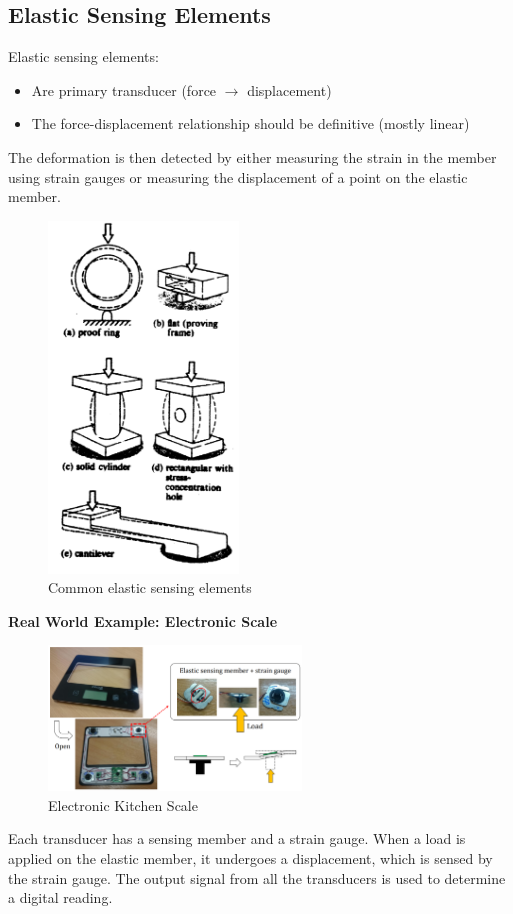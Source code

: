 \documentclass[class=report, crop=false, 12pt,a4paper]{standalone}
\begin{document}
\subsection{Elastic Sensing Elements}
Elastic sensing elements:
\begin{itemize}
  \item Are primary transducer (force $\rightarrow$ displacement)
  \item The force-displacement relationship should be definitive (mostly linear) 
\end{itemize}
The deformation is then detected by either measuring the strain in the member using strain gauges or measuring the displacement of a point on the elastic member.
\begin{figure}[H]
  \centering
  \includegraphics[width = 0.45\textwidth]{../img/Mdiagram23.png}
  \caption{Common elastic sensing elements}
\end{figure}
\textbf{Real World Example: Electronic Scale}
\begin{figure}[H]
  \centering
  \includegraphics[width = 0.6\textwidth]{../img/Mdiagram24.png}
  \caption{Electronic Kitchen Scale}
\end{figure} 
Each transducer has a sensing member and a strain gauge. When a load is applied on the elastic member, it undergoes a displacement, which is sensed by the strain gauge. The output signal from all the transducers is used to determine a digital reading. 
\end{document}
